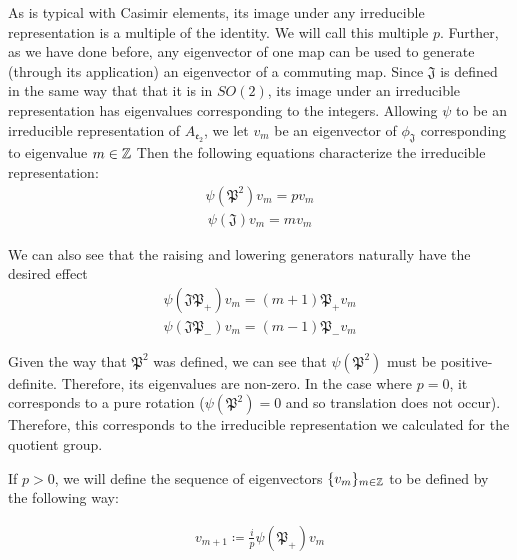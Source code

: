 As is typical with Casimir elements, its image under any irreducible representation is a multiple of the identity. We will call this multiple $p$. Further, as we have done before, any eigenvector of one map can be used to generate (through its application) an eigenvector of a commuting map. Since $\mathfrak{J}$ is defined in the same way that that it is in $SO(2)$, its image under an irreducible representation has eigenvalues corresponding to the integers. Allowing $\psi$ to be an irreducible representation of $A_\mathfrak{e_2}$, we let $v_m$ be an eigenvector of $\phi_\mathfrak{J}$ corresponding to eigenvalue $m\in\mathbb{Z}$ Then the following equations characterize the irreducible representation:
\begin{equation}
\begin{aligned}
	 \psi(\mathfrak{P}^2)v_m = pv_m
\end{aligned}
\end{equation}
\begin{equation}
\begin{aligned}
	 \psi(\mathfrak{J})v_m = mv_m
\end{aligned}
\end{equation}

We can also see that the raising and lowering generators naturally have the desired effect
\begin{equation}
\begin{aligned}
	 \psi(\mathfrak{J}\mathfrak{P}_+)v_m = (m+1)\mathfrak{P}_+v_m
\end{aligned}
\end{equation}
\begin{equation}
\begin{aligned}
	 \psi(\mathfrak{J}\mathfrak{P}_-)v_m = (m-1)\mathfrak{P}_-v_m
\end{aligned}
\end{equation}

Given the way that $\mathfrak{P}^2$ was defined, we can see that $\psi(\mathfrak{P}^2)$ must be positive-definite. Therefore, its eigenvalues are non-zero. In the case where $p=0$, it corresponds to a pure rotation ($\psi(\mathfrak{P}^2) = 0$ and so translation does not occur). Therefore, this corresponds to the irreducible representation we calculated for the quotient group. 

If $p>0$, we will define the sequence of eigenvectors $\{v_m\}_{m\in\mathbb{Z}}$ to be defined by the following way:

\begin{equation}
\begin{aligned}
	 v_{m+1} \coloneq \frac{i}{p}\psi(\mathfrak{P}_+)v_m
\end{aligned}
\end{equation}

